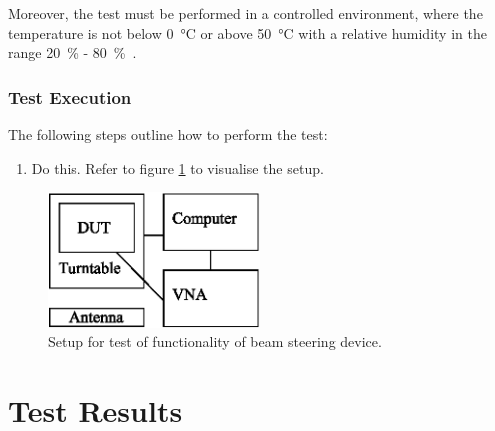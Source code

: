 Moreover, the test must be performed in a controlled environment, where the temperature is not below \SI{0}{\celsius} or above \SI{50}{\celsius} with a relative humidity in the range \SI{20}{\percent} - \SI{80}{\percent}~\cite{hrt_i_data_sheet}.

\subsubsection{Test Execution}
The following steps outline how to perform the test:

\begin{enumerate}
    \item Do this. Refer to figure \ref{fig:experiment-setup} to visualise the setup.
\end{enumerate}

\begin{figure}[h]
    \centering
    \includegraphics[width=0.5\textwidth]{figures/accept-test-setup.eps}
    \caption{Setup for test of functionality of beam steering device.} \label{fig:experiment-setup}
\end{figure}

\section{Test Results}
